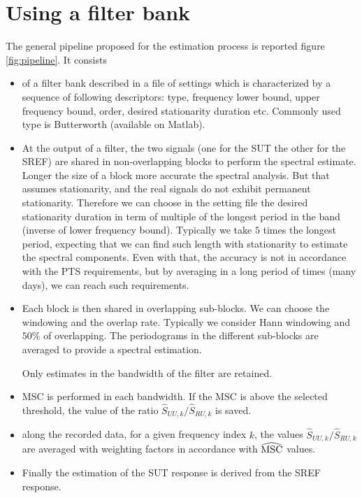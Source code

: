 \section{Using a filter bank}
The general pipeline proposed for the estimation process is reported figure \ref{fig:pipeline}. It consists 
\begin{itemize}
\item
of a filter bank described in a file of settings which is characterized by a sequence of following descriptors: type, frequency lower bound, upper frequency bound, order, desired stationarity duration etc. Commonly used type is Butterworth (available on Matlab).
\item
At the output of a filter, the two signals (one for the SUT the other for the SREF) are shared in non-overlapping blocks to perform the spectral estimate. Longer the size of a block more accurate the spectral analysis. But that assumes stationarity, and the real signals do not exhibit permanent stationarity. Therefore we can choose in the setting file the desired stationarity duration in term of multiple of the longest period in the band (inverse of lower frequency bound). Typically we take  $5$ times the longest period, expecting that we can find such length with stationarity to estimate the spectral components. Even with that, the accuracy is not in accordance with the PTS requirements, but by averaging in a long period of times (many days), we can reach such requirements.


\item
Each block is then shared in overlapping sub-blocks. We can choose the windowing and the overlap rate. Typically we consider Hann windowing and $50\%$ of overlapping. The periodograms in the different sub-blocks are averaged to provide a spectral estimation. 

Only estimates in the bandwidth of the filter are retained.

\item
MSC is performed in each bandwidth. If the MSC is above the selected threshold, the value of the ratio $\hat S_{UU,k}/\hat S_{RU,k}$ is saved.



\item
along the recorded data, for a given frequency index $k$, the values  $\hat S_{UU,k}/\hat S_{RU,k}$ are averaged with weighting factors in accordance with $\widehat{\mathrm{MSC}}$ values.


\item
Finally the estimation of the SUT response is derived from the SREF response.


\end{itemize}

